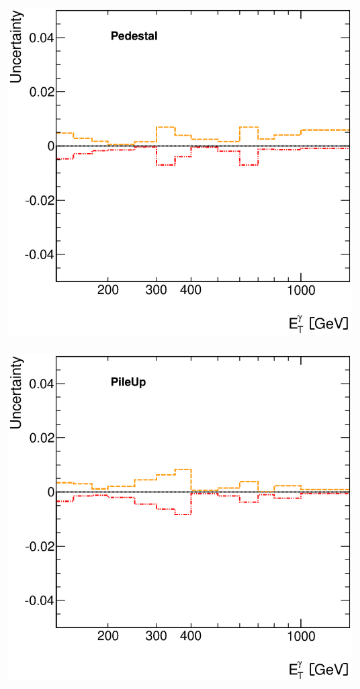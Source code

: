 \documentclass[12pt, twoside]{article}
\numberwithin{equation}{section}
\numberwithin{figure}{section}
\newenvironment{changemargin}[2]{%
\begin{list}{}{%
\setlength{\topsep}{0pt}%
\setlength{\leftmargin}{#1}%
\setlength{\rightmargin}{#2}%
\setlength{\listparindent}{\parindent}%
\setlength{\itemindent}{\parindent}%
\setlength{\parsep}{\parskip}%
}%
\item[]}{\end{list}}
\begin{document}
\begin{figure}
\begin{changemargin}{-1.0cm}{-0.75cm}
\begin{changemargin}{-0.75cm}{-1.0cm}
        \begin{subfigure}[b]{0.27\textwidth}
            \includegraphics[width=\textwidth]{./images/PhotonSystematics/PhotonSystematic-20.eps}
        \end{subfigure}
        \begin{subfigure}[b]{0.27\textwidth}
            \includegraphics[width=\textwidth]{./images/PhotonSystematics/PhotonSystematic-21.eps}

\end{subfigure}
\end{changemargin}
\end{changemargin}
\end{figure}
\end{document}
